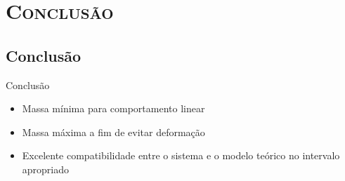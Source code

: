\documentclass[xcolor=x11names,compress]{beamer}
\renewcommand{\(}{\begin{columns}}
\renewcommand{\)}{\end{columns}}
\newcommand{\<}[1]{\begin{column}{#1}}
\renewcommand{\>}{\end{column}}
\begin{document}

\section{\scshape Conclusão}


\subsection{Conclusão}

\begin{frame}{Conclusão}
	\begin{itemize}
		\item Massa mínima para comportamento linear
		\item Massa máxima a fim de evitar deformação
		\item Excelente compatibilidade entre o sistema e o modelo teórico no intervalo apropriado
	\end{itemize}
\end{frame}
\end{document}
